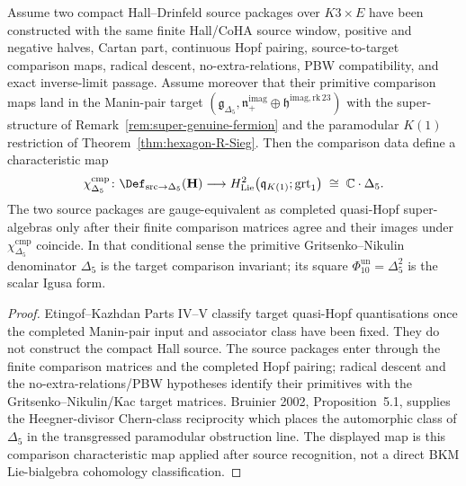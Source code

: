 \begin{theorem}
\label{thm:k3-classification-etingof}
Assume two compact Hall--Drinfeld source packages over \(K3\times E\)
have been constructed with the same finite Hall/CoHA source window,
positive and negative halves, Cartan part, continuous Hopf pairing,
source-to-target comparison maps, radical descent, no-extra-relations,
PBW compatibility, and exact inverse-limit passage.  Assume moreover that
their primitive comparison maps land in the Manin-pair target
$(\mathfrak{g}_{\Delta_5},\mathfrak{n}_+^{\mathrm{imag}}\oplus
\mathfrak{h}^{\mathrm{imag,rk\,23}})$ with the super-structure of
Remark~\ref{rem:super-genuine-fermion} and the paramodular \(K(1)\)
restriction of Theorem~\ref{thm:hexagon-R-Sieg}.  Then the comparison data
define a characteristic map
\[
 \chi^{\mathrm{cmp}}_{\Delta_5}\colon
 \Def_{\mathrm{src}\to\Delta_5}(\mathbf H)
 \longrightarrow
 H^2_{\mathrm{Lie}}\bigl(\mathfrak{q}_{K(1)};\mathrm{grt}_1\bigr)
 \;\cong\;
 \mathbb{C}\cdot \Delta_5.
\]
The two source packages are gauge-equivalent as completed quasi-Hopf
super-algebras only after their finite comparison matrices agree and their
images under \(\chi^{\mathrm{cmp}}_{\Delta_5}\) coincide.  In that
conditional sense the primitive Gritsenko--Nikulin denominator \(\Delta_5\)
is the target comparison invariant; its square
\(\Phi_{10}^{\mathrm{un}}=\Delta_5^2\) is the scalar Igusa form.
\end{theorem}

\begin{proof}
Etingof--Kazhdan Parts IV--V classify target quasi-Hopf quantisations once
the completed Manin-pair input and associator class have been fixed.  They
do not construct the compact Hall source.  The source packages enter through
the finite comparison matrices and the completed Hopf pairing; radical
descent and the no-extra-relations/PBW hypotheses identify their primitives
with the Gritsenko--Nikulin/Kac target matrices.  Bruinier 2002,
Proposition~5.1, supplies the Heegner-divisor Chern-class reciprocity which
places the automorphic class of \(\Delta_5\) in the transgressed
paramodular obstruction line.  The displayed map is this comparison
characteristic map applied after source recognition, not a direct
BKM Lie-bialgebra cohomology classification.
\end{proof}

